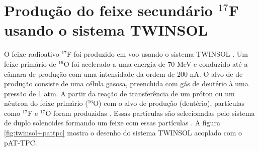 \documentclass[a4paper,12pt,oneside]{book}
\begin{document}



\section{Produção do feixe secundário $^{17}$F usando o sistema TWINSOL}\label{sec:twinsol}

\par O feixe radioativo $^{17}$F foi produzido em voo usando o sistema TWINSOL \cite{KOLATA1989503, NDtandem}. Um feixe primário de $^{16}$O foi acelerado a uma energia de 70 MeV e conduzido até a câmara de produção com uma intensidade da ordem de 200 nA. O alvo de de produção consiste de uma célula gasosa, preenchida com gás de deutério à uma pressão de 1 atm. A partir da reação de transferência de um próton ou um nêutron do feixe primário ($^{16}$O) com o alvo de produção (deutério), partículas como $^{17}$F e $^{17}$O foram produzidas \cite{KOLATA1989503, twinsol}. Essas partículas são selecionadas pelo sistema de duplo solenoides formando um feixe com essas partículas \cite{twinsol, ribras_leo}. A figura \ref{fig:twinsol+pattpc} mostra o desenho do sistema TWINSOL acoplado com o pAT-TPC.

\end{document}
